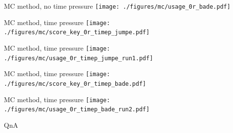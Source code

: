 \documentclass[hyperref={pdfpagelabels=false}]{beamer}
\begin{document}
\begin{frame}{MC method, no time pressure}
\texttt{[image: ./figures/mc/usage\_0r\_bade.pdf]}
\end{frame}

\begin{frame}{MC method, time pressure}
\texttt{[image: ./figures/mc/score\_key\_0r\_timep\_jumpe.pdf]}
\end{frame}

\begin{frame}{MC method, time pressure}
\texttt{[image: ./figures/mc/usage\_0r\_timep\_jumpe\_run1.pdf]}
\end{frame}

\begin{frame}{MC method, time pressure}
\texttt{[image: ./figures/mc/score\_key\_0r\_timep\_bade.pdf]}
\end{frame}

\begin{frame}{MC method, time pressure}
\texttt{[image: ./figures/mc/usage\_0r\_timep\_bade\_run2.pdf]}
\end{frame}

\begin{frame}{QnA}

\end{frame}
\end{document}
